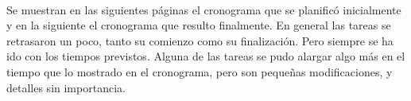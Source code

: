 
\paragraph{} Se muestran en las siguientes páginas el cronograma que se planificó inicialmente y en la siguiente el cronograma que resulto finalmente. En general las tareas se retrasaron un poco, tanto su comienzo como su finalización. Pero siempre se ha ido con los tiempos previstos. Alguna de las tareas se pudo alargar algo más en el tiempo que lo mostrado en el cronograma, pero son pequeñas modificaciones, y detalles sin importancia. 






